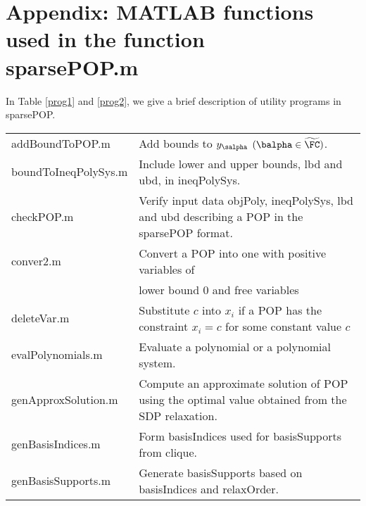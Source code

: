 
\section*{Appendix: MATLAB functions used in the function \\ 
sparsePOP.m} 
\label{functions}

In Table \ref{prog1} and \ref{prog2}, we give a brief description of utility programs in sparsePOP.
\hspace*{-2.0cm}
\begin{table}
\begin{tabular}{|l|p{10cm}|} \hline
addBoundToPOP.m & Add bounds to $y_{\salpha}$ $(\balpha \in \widetilde{\FC})$. \\
boundToIneqPolySys.m & Include lower and upper bounds, {\sf lbd} and {\sf ubd}, in {\sf ineqPolySys}. \\
checkPOP.m &  Verify input data {\sf objPoly}, {\sf ineqPolySys}, {\sf lbd} and {\sf ubd} describing a POP in the sparsePOP format. \\
conver2.m& Convert a POP into one with positive variables of \\
& lower bound $0$ and free variables\\
deleteVar.m & Substitute $c$ into $x_i$ if a POP has the constraint $x_i = c$ for some constant value $c$\\
evalPolynomials.m  & Evaluate a polynomial or a polynomial system. \\
genApproxSolution.m  & Compute an approximate solution of POP using the optimal value obtained from the SDP relaxation. \\
genBasisIndices.m  & Form {\sf basisIndices} used for {\sf basisSupports} from {\sf clique}. \\ 
genBasisSupports.m  & Generate {\sf basisSupports} based on {\sf basisIndices} and {\sf relaxOrder}. \\ 

\end{tabular}
\end{table}
